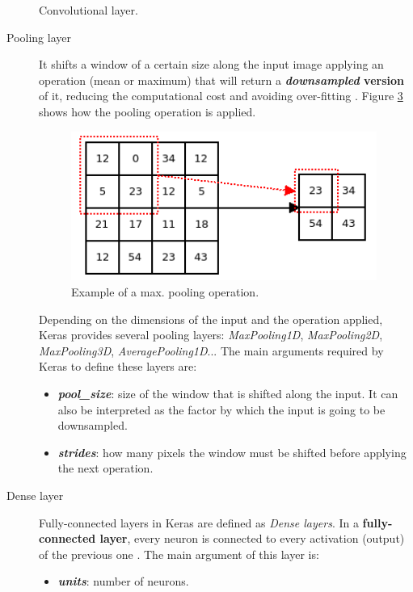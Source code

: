 \begin{description}
\begin{figure}
\begin{subfigure}{0.7\textwidth}
			\caption{}\label{fig:conv_b}
		\end{subfigure}
		\caption{Convolutional layer.}
		\label{fig:convlayer}
	\end{figure}
	
\end{description}

\begin{description}
	\item[{Pooling layer}] It shifts a window of a certain size along the input image applying an operation (mean or maximum) that will return a \textbf{\textit{downsampled} version} of it, reducing the computational cost and avoiding over-fitting \cite{Scherer2010Evaluation}. Figure \ref{fig:pooling} shows how the pooling operation is applied.

	\begin{figure}
		\centering
		\includegraphics[width=10cm, keepaspectratio]{figures/pooling.png}
		\caption{Example of a max. pooling operation.}
		\label{fig:pooling}
	\end{figure}
	
	Depending on the dimensions of the input and the operation applied, Keras provides several pooling layers: \textit{MaxPooling1D}, \textit{MaxPooling2D}, \textit{MaxPooling3D}, \textit{AveragePooling1D}... The main arguments required by Keras to define these layers are:
	\begin{itemize}
		\item \textbf{\textit{pool\_size}}: size of the window that is shifted along the input. It can also be interpreted as the factor by which the input is going to be downsampled.
		\item \textbf{\textit{strides}}: how many pixels the window must be shifted before applying the next operation.
	\end{itemize}
\end{description}

\begin{description}
	\item[Dense layer] Fully-connected layers in Keras are defined as \textit{Dense layers}. In a \textbf{fully-connected layer}, every neuron is connected to every activation (output) of the previous one \cite{cs231n}. The main argument of this layer is:
	\begin{itemize}
		\item \textbf{\textit{units}}: number of neurons.
	\end{itemize} 
\end{description}

